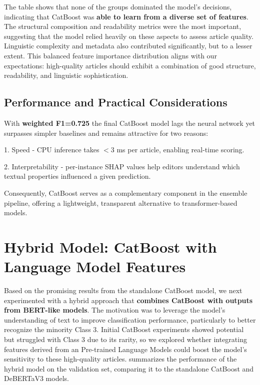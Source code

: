 The table shows that none of the groups dominated the model's decisions, indicating that \ac{CatBoost} was \textbf{able to learn from a diverse set of features}. The structural composition and readability metrics were the most important, suggesting that the model relied heavily on these aspects to assess article quality. Linguistic complexity and metadata also contributed significantly, but to a lesser extent. This balanced feature importance distribution aligns with our expectations: high-quality articles should exhibit a combination of good structure, readability, and linguistic sophistication.

\subsection{Performance and Practical Considerations}
With \textbf{weighted F1=0.725} the final \ac{CatBoost} model lags the neural network yet surpasses simpler baselines and remains attractive for two reasons:

1. Speed - CPU inference takes $< 3$ ms per article, enabling real-time scoring.

2. Interpretability - per-instance SHAP values help editors understand which textual properties influenced a given prediction.

Consequently, \ac{CatBoost} serves as a complementary component in the ensemble pipeline, offering a lightweight, transparent alternative to transformer-based models. 

\section{Hybrid Model: CatBoost with Language Model Features}

Based on the promising results from the standalone \ac{CatBoost} model, we next experimented with a hybrid approach that \textbf{combines \ac{CatBoost} with outputs from \ac{BERT}-like models}. The motivation was to leverage the model's understanding of text to improve classification performance, particularly to better recognize the minority \ac{Class 3}. Initial \ac{CatBoost} experiments showed potential but struggled with \ac{Class 3} due to its rarity, so we explored whether integrating features derived from an Pre-trained Language Models could boost the model's sensitivity to these high-quality articles.  summarizes the performance of the hybrid model on the validation set, comparing it to the standalone \ac{CatBoost} and \ac{DeBERTaV3} models.

